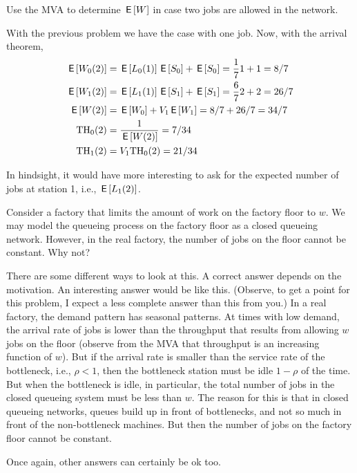 \begin{exercise}[201804]
 Use the MVA to determine $\,\mathsf{E}\left[W\right]$ in case two jobs are allowed in the network.
\begin{solution}
 With the previous problem we have the case with one job. Now, with the arrival theorem,
 \begin{align*}
\,\mathsf{E}\left[W_{0}(2)\right] &= \,\mathsf{E}\left[L_0(1)\right]\,\mathsf{E}\left[S_0\right] +\,\mathsf{E}\left[S_0\right] = \frac{1}{7} 1 + 1=8/7\\
\,\mathsf{E}\left[W_{1}(2)\right] &= \,\mathsf{E}\left[L_1(1)\right]\,\mathsf{E}\left[S_1\right] +\,\mathsf{E}\left[S_1\right] = \frac{6}{7} 2 + 2 = 26/7\\
\,\mathsf{E}\left[W(2)\right] &= \,\mathsf{E}\left[W_0\right] + V_1 \,\mathsf{E}\left[W_1\right] = 8/7 + 26/7 = 34/7\\
\mathrm{TH}_0(2) &= \frac{1}{\,\mathsf{E}\left[W(2)\right]} = 7/34\\
\mathrm{TH}_1(2)&= V_1 \mathrm{TH}_0(2) = 21/34\\
 \end{align*}

In hindsight, it would have more interesting to ask for the expected number of jobs at station 1, i.e., $\,\mathsf{E}\left[L_1(2)\right]$. 
\end{solution}
\end{exercise}

\begin{exercise}[201804]
Consider a factory that limits the amount of work on the factory floor to $w$. We may model the queueing process on the factory floor as a closed queueing network. However, in the real factory, the number of jobs on the floor cannot be constant. Why not?
\begin{solution}
 There are some different ways to look at this. A correct answer depends on the motivation. An interesting answer would be like this. (Observe, to get a point for this problem, I expect a less complete answer than this from you.) In a real factory, the demand pattern has seasonal patterns. At times with low demand, the arrival rate of jobs is lower than the throughput that results from allowing $w$ jobs on the floor (observe from the MVA that throughput is an increasing function of $w$). But if the arrival rate is smaller than the service rate of the bottleneck, i.e., $\rho<1$, then the bottleneck station must be idle $1-\rho$ of the time. But when the bottleneck is idle, in particular, the total number of jobs in the closed queueing system must be less than $w$. The reason for this is that in closed queueing networks, queues build up in front of bottlenecks, and not so much in front of the non-bottleneck machines. But then the number of jobs on the factory floor cannot be constant. 

Once again, other answers can certainly be ok too. 
\end{solution}
\end{exercise}


